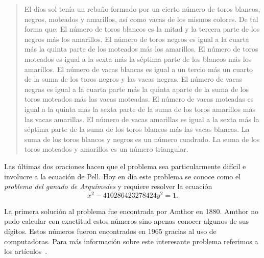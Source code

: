 \begin{quote}
	El dios sol tenía un rebaño formado por un cierto número de toros blancos,
	negros, moteados y amarillos, así como vacas de los mismos colores. De tal
	forma que: El número de toros blancos es la mitad y la tercera parte de los
	negros más los amarillos.  El número de toros negros es igual a la cuarta
	más la quinta parte de los moteados más los amarillos.  El número de toros
	moteados es igual a la sexta más la séptima parte de los blancos más los
	amarillos.  El número de vacas blancas es igual a un tercio más un cuarto
	de la suma de los toros negros y las vacas negras.  El número de vacas
	negras es igual a la cuarta parte más la quinta aparte de la suma de los
	toros moteados más las vacas moteadas.  El número de vacas moteadas es
	igual a la quinta más la sexta parte de la suma de los toros amarillos más
	las vacas amarillas.  El número de vacas amarillas es igual a la sexta más
	la séptima parte de la suma de los toros blancos más las vacas blancas. La
	suma de los toros blancos y negros es un número cuadrado.  La suma de los
	toros moteados y amarillos es un número triangular.
\end{quote}

Las últimas dos oraciones hacen que el problema sea particularmente difícil e
involucre a la ecuación de Pell.  Hoy en día este problema se conoce como el
\emph{problema del ganado de Arquímedes} y requiere resolver la ecuación 
\[
	x^2- 410286423278424y^2=1.
\]

La primera solución al problema fue encontrada por Amthor en 1880. Amthor no
pudo calcular con exactitud estos números sino apenas conocer algunos de sus
dígitos. Estos números fueron encontrados en 1965 gracias al uso de
computadoras. Para más información sobre este interesante problema referimos a
los artículos~\cite{MR1513794,MR1875156,MR1238181,MR1614879,MR1344311}.


